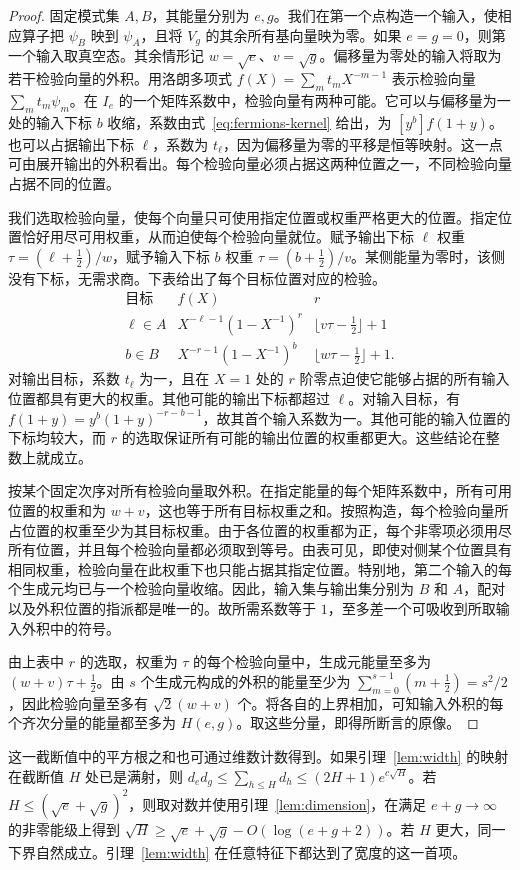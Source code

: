 \begin{proof}
固定模式集 $A,B$，其能量分别为 $e,g$。我们在第一个点构造一个输入，使相应算子把 $\psi_B$ 映到 $\psi_A$，且将 $V_g$ 的其余所有基向量映为零。如果 $e=g=0$，则第一个输入取真空态。其余情形记 $w=\sqrt e$、$v=\sqrt g$。偏移量为零处的输入将取为若干检验向量的外积。用洛朗多项式 $f(X)=\sum_m t_m X^{-m-1}$ 表示检验向量 $\sum_m t_m\psi_m$。在 $I_e$ 的一个矩阵系数中，检验向量有两种可能。它可以与偏移量为一处的输入下标 $b$ 收缩，系数由式~\eqref{eq:fermions-kernel} 给出，为 $[y^b]f(1+y)$。也可以占据输出下标 $\ell$，系数为 $t_\ell$，因为偏移量为零的平移是恒等映射。这一点可由展开输出的外积看出。每个检验向量必须占据这两种位置之一，不同检验向量占据不同的位置。

我们选取检验向量，使每个向量只可使用指定位置或权重严格更大的位置。指定位置恰好用尽可用权重，从而迫使每个检验向量就位。赋予输出下标 $\ell$ 权重 $\tau=(\ell+\tfrac12)/w$，赋予输入下标 $b$ 权重 $\tau=(b+\tfrac12)/v$。某侧能量为零时，该侧没有下标，无需求商。下表给出了每个目标位置对应的检验。
\[
\begin{array}{c|c|c}
\text{目标}& f(X)& r\\ \hline
\ell\in A&X^{-\ell-1}(1-X^{-1})^r&
   \lfloor v\tau-\tfrac12\rfloor+1\\
b\in B&X^{-r-1}(1-X^{-1})^b&
   \lfloor w\tau-\tfrac12\rfloor+1 .
\end{array}
\]
对输出目标，系数 $t_\ell$ 为一，且在 $X=1$ 处的 $r$ 阶零点迫使它能够占据的所有输入位置都具有更大的权重。其他可能的输出下标都超过 $\ell$。对输入目标，有 $f(1+y)=y^b(1+y)^{-r-b-1}$，故其首个输入系数为一。其他可能的输入位置的下标均较大，而 $r$ 的选取保证所有可能的输出位置的权重都更大。这些结论在整数上就成立。

按某个固定次序对所有检验向量取外积。在指定能量的每个矩阵系数中，所有可用位置的权重和为 $w+v$，这也等于所有目标权重之和。按照构造，每个检验向量所占位置的权重至少为其目标权重。由于各位置的权重都为正，每个非零项必须用尽所有位置，并且每个检验向量都必须取到等号。由表可见，即使对侧某个位置具有相同权重，检验向量在此权重下也只能占据其指定位置。特别地，第二个输入的每个生成元均已与一个检验向量收缩。因此，输入集与输出集分别为 $B$ 和 $A$，配对以及外积位置的指派都是唯一的。故所需系数等于 $1$，至多差一个可吸收到所取输入外积中的符号。

由上表中 $r$ 的选取，权重为 $\tau$ 的每个检验向量中，生成元能量至多为 $(w+v)\tau+\tfrac12$。由 $s$ 个生成元构成的外积的能量至少为 $\sum_{m=0}^{s-1}(m+\tfrac12)=s^2/2$，因此检验向量至多有 $\sqrt2(w+v)$ 个。将各自的上界相加，可知输入外积的每个齐次分量的能量都至多为 $H(e,g)$。取这些分量，即得所断言的原像。
\end{proof}

这一截断值中的平方根之和也可通过维数计数得到。如果引理~\ref{lem:width} 的映射在截断值 $H$ 处已是满射，则 $d_e d_g\le \sum_{h\le H}d_h\le (2H+1)e^{c\sqrt H}$。若 $H\le(\sqrt e+\sqrt g)^2$，则取对数并使用引理~\ref{lem:dimension}，在满足 $e+g\to\infty$ 的非零能级上得到 $\sqrt H\ge\sqrt e+\sqrt g-O(\log(e+g+2))$。若 $H$ 更大，同一下界自然成立。引理~\ref{lem:width} 在任意特征下都达到了宽度的这一首项。
